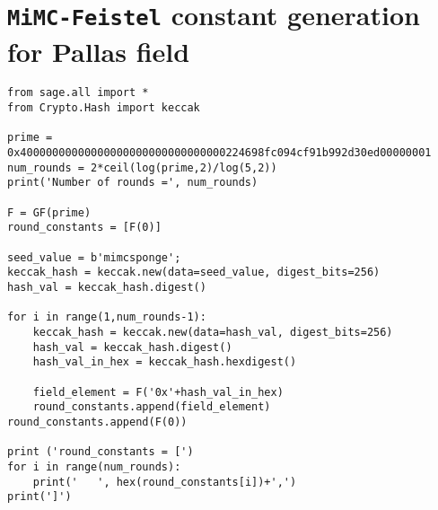 \documentclass[10pt]{article}
\begin{document}
\newpage
\section{\texttt{MiMC-Feistel} constant generation for Pallas field}%
\label{sec:mimc_feistel_constant_generation_for_pallas}
\begin{verbatim}
from sage.all import *
from Crypto.Hash import keccak

prime = 0x40000000000000000000000000000000224698fc094cf91b992d30ed00000001
num_rounds = 2*ceil(log(prime,2)/log(5,2))
print('Number of rounds =', num_rounds)

F = GF(prime)
round_constants = [F(0)]

seed_value = b'mimcsponge';
keccak_hash = keccak.new(data=seed_value, digest_bits=256)
hash_val = keccak_hash.digest()

for i in range(1,num_rounds-1):
    keccak_hash = keccak.new(data=hash_val, digest_bits=256)
    hash_val = keccak_hash.digest()
    hash_val_in_hex = keccak_hash.hexdigest()

    field_element = F('0x'+hash_val_in_hex)
    round_constants.append(field_element)
round_constants.append(F(0))

print ('round_constants = [')
for i in range(num_rounds):
    print('   ', hex(round_constants[i])+',')
print(']')
\end{verbatim}


\newpage


\end{document}
